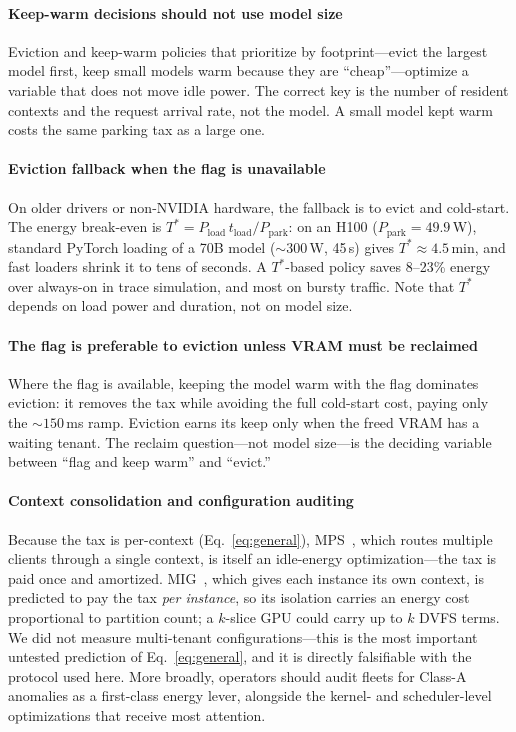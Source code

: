 \documentclass[conference]{IEEEtran}
\begin{document}
\paragraph{Keep-warm decisions should not use model size}
Eviction and keep-warm policies that prioritize by footprint---evict the largest model first, keep small models warm because they are ``cheap''---optimize a variable that does not move idle power. The correct key is the number of resident contexts and the request arrival rate, not the model. A small model kept warm costs the same parking tax as a large one.

\paragraph{Eviction fallback when the flag is unavailable}
On older drivers or non-NVIDIA hardware, the fallback is to evict and cold-start. The energy break-even is $T^{*} = P_{\text{load}}\,t_{\text{load}}/P_{\text{park}}$: on an H100 ($P_{\text{park}}=49.9$\,W), standard PyTorch loading of a 70B model (${\sim}300$\,W, 45\,s) gives $T^{*}\approx 4.5$\,min, and fast loaders shrink it to tens of seconds. A $T^{*}$-based policy saves 8--23\% energy over always-on in trace simulation, and most on bursty traffic. Note that $T^{*}$ depends on load power and duration, not on model size.

\paragraph{The flag is preferable to eviction unless VRAM must be reclaimed}
Where the flag is available, keeping the model warm with the flag dominates eviction: it removes the tax while avoiding the full cold-start cost, paying only the ${\sim}150$\,ms ramp. Eviction earns its keep only when the freed VRAM has a waiting tenant. The reclaim question---not model size---is the deciding variable between ``flag and keep warm'' and ``evict.''

\paragraph{Context consolidation and configuration auditing}
Because the tax is per-context (Eq.~\ref{eq:general}), MPS~\cite{nvidia-mps}, which routes multiple clients through a single context, is itself an idle-energy optimization---the tax is paid once and amortized. MIG~\cite{nvidia-mig}, which gives each instance its own context, is predicted to pay the tax \emph{per instance}, so its isolation carries an energy cost proportional to partition count; a $k$-slice GPU could carry up to $k$ DVFS terms. We did not measure multi-tenant configurations---this is the most important untested prediction of Eq.~\ref{eq:general}, and it is directly falsifiable with the protocol used here. More broadly, operators should audit fleets for Class-A anomalies as a first-class energy lever, alongside the kernel- and scheduler-level optimizations that receive most attention.
\end{document}
